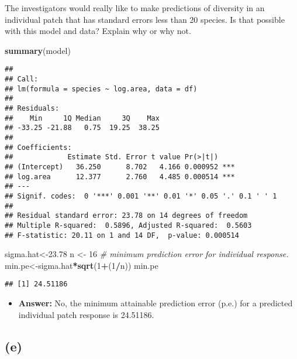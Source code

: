 \documentclass[]{article}
\newenvironment{Shaded}{\begin{snugshade}}{\end{snugshade}}
\newcommand{\KeywordTok}[1]{\textcolor[rgb]{0.13,0.29,0.53}{\textbf{#1}}}
\newcommand{\DecValTok}[1]{\textcolor[rgb]{0.00,0.00,0.81}{#1}}
\newcommand{\FloatTok}[1]{\textcolor[rgb]{0.00,0.00,0.81}{#1}}
\newcommand{\StringTok}[1]{\textcolor[rgb]{0.31,0.60,0.02}{#1}}
\newcommand{\CommentTok}[1]{\textcolor[rgb]{0.56,0.35,0.01}{\textit{#1}}}
\newcommand{\OperatorTok}[1]{\textcolor[rgb]{0.81,0.36,0.00}{\textbf{#1}}}
\newcommand{\NormalTok}[1]{#1}
\providecommand{\tightlist}{%
  \setlength{\itemsep}{0pt}\setlength{\parskip}{0pt}}
\begin{document}
The investigators would really like to make predictions of diversity in
an individual patch that has standard errors less than 20 species. Is
that possible with this model and data? Explain why or why not.

\begin{Shaded}
\begin{Highlighting}[]
\KeywordTok{summary}\NormalTok{(model)}
\end{Highlighting}
\end{Shaded}

\begin{verbatim}
## 
## Call:
## lm(formula = species ~ log.area, data = df)
## 
## Residuals:
##    Min     1Q Median     3Q    Max 
## -33.25 -21.88   0.75  19.25  38.25 
## 
## Coefficients:
##             Estimate Std. Error t value Pr(>|t|)    
## (Intercept)   36.250      8.702   4.166 0.000952 ***
## log.area      12.377      2.760   4.485 0.000514 ***
## ---
## Signif. codes:  0 '***' 0.001 '**' 0.01 '*' 0.05 '.' 0.1 ' ' 1
## 
## Residual standard error: 23.78 on 14 degrees of freedom
## Multiple R-squared:  0.5896, Adjusted R-squared:  0.5603 
## F-statistic: 20.11 on 1 and 14 DF,  p-value: 0.000514
\end{verbatim}

\begin{Shaded}
\begin{Highlighting}[]
\NormalTok{sigma.hat<-}\FloatTok{23.78}
\NormalTok{n <-}\StringTok{ }\DecValTok{16}
\CommentTok{# minimum prediction error for individual response.}
\NormalTok{min.pe<-sigma.hat}\OperatorTok{*}\KeywordTok{sqrt}\NormalTok{(}\DecValTok{1}\OperatorTok{+}\NormalTok{(}\DecValTok{1}\OperatorTok{/}\NormalTok{n))}
\NormalTok{min.pe}
\end{Highlighting}
\end{Shaded}

\begin{verbatim}
## [1] 24.51186
\end{verbatim}

\begin{itemize}
\tightlist
\item
  \textbf{Answer:} No, the minimum attainable prediction error (p.e.)
  for a predicted individual patch response is 24.51186.
\end{itemize}

\subsection{(e)}\label{e-2}
\end{document}
